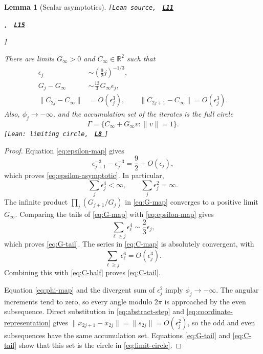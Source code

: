 \documentclass[11pt]{article}
\newtheorem{lemma}[theorem]{Lemma}
\newcommand{\R}{\mathbb R}
\newcommand{\leanLinkText}[1]{%
  \underline{\textbf{#1}}%
}
\newcommand{\leanSnapshot}{e308927f5b7930bdd002f0c0e42b9d112ad821cb}
\newcommand{\leanDeclTag}[2]{%
  {\footnotesize\texttt{[Lean source, }}%
  \href{https://github.com/imathwy/DFP_wolfe_local/blob/\leanSnapshot/#1?plain=1\#L#2}%
    {\leanLinkText{\footnotesize\texttt{L#2}}}%
}
\newcommand{\leanDeclTagExtra}[2]{%
  \unskip
  {\footnotesize\texttt{, }}%
  \href{https://github.com/imathwy/DFP_wolfe_local/blob/\leanSnapshot/#1?plain=1\#L#2}%
    {\leanLinkText{\footnotesize\texttt{L#2}}}\allowbreak
}
\newcommand{\leanDeclTagEnd}{%
  \unskip
  {\footnotesize\texttt{]}}\enspace
}
\newcommand{\leanClaimTag}[3]{%
  {\footnotesize\texttt{[Lean: #1, }}%
  \href{https://github.com/imathwy/DFP_wolfe_local/blob/\leanSnapshot/#2?plain=1\#L#3}%
    {\leanLinkText{\footnotesize\texttt{L#3}}}%
  {\footnotesize\texttt{]}}\enspace
}
\begin{document}
\begin{lemma}[Scalar asymptotics]\label{lem:scalar-asymptotics}
\leanDeclTag{DFPWolfe/A_uniformly_convex_counterexample_to_global_convergence_of_DFP_under_weak_Wolfe_/Lemma_Scalar_asymptotics.lean}{11}
\leanDeclTagExtra{DFPWolfe/A_uniformly_convex_counterexample_to_global_convergence_of_DFP_under_weak_Wolfe_/Lemma_4_9_Full_limiting_circle_as_the_endpoint_accumulation_set.lean}{15}
\leanDeclTagEnd
There are limits $G_\infty>0$ and $C_\infty\in\R^2$ such that
\begin{align}
\epsilon_j&\sim\left(\frac92j\right)^{-1/3},
\label{eq:epsilon-asymptotic}\\
G_j-G_\infty&\sim\frac{13}{3}G_\infty\epsilon_j,
\label{eq:G-tail}\\
\|C_{2j}-C_\infty\|&=O(\epsilon_j^3),
\qquad
\|C_{2j+1}-C_\infty\|=O(\epsilon_j^3).
\label{eq:C-tail}
\end{align}
Also, $\phi_j\to-\infty$, and the accumulation set of the iterates is
the full circle
\begin{equation}\label{eq:limit-circle}
\Gamma=\{C_\infty+G_\infty v:\|v\|=1\}.
\end{equation}
\leanClaimTag{limiting circle}{DFPWolfe/A_uniformly_convex_counterexample_to_global_convergence_of_DFP_under_weak_Wolfe_/Definition_4_8b_Limiting_circle_and_endpoint_closed_set_candidate.lean}{8}
\end{lemma}

\begin{proof}
Equation \eqref{eq:epsilon-map} gives
\[
\epsilon_{j+1}^{-3}-\epsilon_j^{-3}
=\frac92+O(\epsilon_j),
\]
which proves \eqref{eq:epsilon-asymptotic}.  In particular,
\[
\sum_j\epsilon_j^4<\infty,
\qquad
\sum_j\epsilon_j^2=\infty.
\]
The infinite product $\prod_j(G_{j+1}/G_j)$ in \eqref{eq:G-map}
converges to a positive limit $G_\infty$.  Comparing the tails of
\eqref{eq:G-map} with
\eqref{eq:epsilon-map} gives
\[
\sum_{\ell\ge j}\epsilon_\ell^4\sim\frac23\epsilon_j,
\]
which proves \eqref{eq:G-tail}.  The series in \eqref{eq:C-map} is absolutely
convergent, with
\[
\sum_{\ell\ge j}\epsilon_\ell^6=O(\epsilon_j^3).
\]
Combining this with \eqref{eq:C-half} proves \eqref{eq:C-tail}.

Equation \eqref{eq:phi-map} and the divergent sum of $\epsilon_j^2$ imply
$\phi_j\to-\infty$.  The angular increments tend to zero, so every angle
modulo $2\pi$ is approached by the even subsequence.  Direct substitution in
\eqref{eq:abstract-step} and \eqref{eq:coordinate-representation} gives
$\|x_{2j+1}-x_{2j}\|=\|s_{2j}\|=O(\epsilon_j^2)$, so the odd and even
subsequences have the same accumulation set.  Equations \eqref{eq:G-tail} and
\eqref{eq:C-tail} show that this set is the circle in
\eqref{eq:limit-circle}.
\end{proof}
\end{document}
